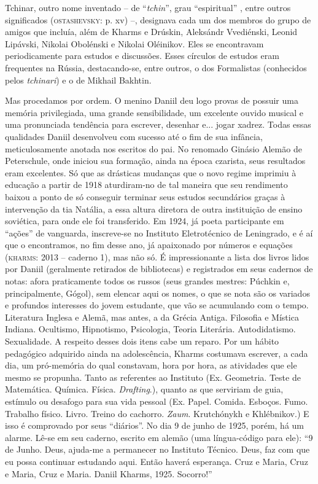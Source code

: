 Tchinar, outro nome inventado -- de ``\emph{tchin}'', grau
``espiritual'' , entre outros significados (\textsc{ostashevsky}: p. xv)
--, designava cada um dos membros do grupo de amigos que incluía, além
de Kharms e Drúskin, Aleksándr Vvediénski, Leonid Lipávski, Nikolai
Obolénski e Nikolai Oléinikov. Eles se encontravam periodicamente para
estudos e discussões. Esses círculos de estudos eram frequentes na
Rússia, destacando-se, entre outros, o dos Formalistas (conhecidos pelos
\emph{tchinari}) e o de Mikhail Bakhtin.

Mas procedamos por ordem. O menino Daniil deu logo provas de possuir uma
memória privilegiada, uma grande sensibilidade, um excelente ouvido
musical e uma pronunciada tendência para escrever, desenhar e... jogar
xadrez. Todas essas qualidades Daniil desenvolveu com sucesso até o fim
de sua infância, meticulosamente anotada nos escritos do pai. No
renomado Ginásio Alemão de Peterschule, onde iniciou sua formação, ainda
na época czarista, seus resultados eram excelentes. Só que as drásticas
mudanças que o novo regime imprimiu à educação a partir de 1918
aturdiram-no de tal maneira que seu rendimento baixou a ponto de só
conseguir terminar seus estudos secundários graças à intervenção da tia
Natália, a essa altura diretora de outra instituição de ensino
soviética, para onde ele foi transferido. Em 1924, já poeta participante
em ``ações'' de vanguarda, inscreve-se no Instituto Eletrotécnico de
Leningrado, e é aí que o encontramos, no fim desse ano, já apaixonado
por números e equações (\textsc{kharms}: 2013 -- caderno 1), mas não só.
É impressionante a lista dos livros lidos por Daniil (geralmente
retirados de bibliotecas) e registrados em seus cadernos de notas: afora
praticamente todos os russos (seus grandes mestres: Púchkin e,
principalmente, Gógol), sem elencar aqui os nomes, o que se nota são os
variados e profundos interesses do jovem estudante, que vão se
acumulando com o tempo. Literatura Inglesa e Alemã, mas antes, a da
Grécia Antiga. Filosofia e Mística Indiana. Ocultismo, Hipnotismo,
Psicologia, Teoria Literária. Autodidatismo. Sexualidade. A respeito
desses dois itens cabe um reparo. Por um hábito pedagógico adquirido
ainda na adolescência, Kharms costumava escrever, a cada dia, um
pró-memória do qual constavam, hora por hora, as atividades que ele
mesmo se propunha. Tanto as referentes ao Instituto (Ex. Geometria.
Teste de Matemática. Química. Física. \emph{Drafting}.), quanto as que
serviriam de guia, estímulo ou desafogo para sua vida pessoal (Ex.
Papel. Comida. Esboços. Fumo. Trabalho físico. Livro. Treino do
cachorro. \emph{Zaum}. Krutchónykh e Khlébnikov.) E isso é comprovado
por seus ``diários''. No dia 9 de junho de 1925, porém, há um alarme.
Lê-se em seu caderno, escrito em alemão (uma língua-código para ele):
``9 de Junho. Deus, ajuda-me a permanecer no Instituto Técnico. Deus,
faz com que eu possa continuar estudando aqui. Então haverá esperança.
Cruz e Maria, Cruz e Maria, Cruz e Maria. Daniil Kharms, 1925.
Socorro!''

